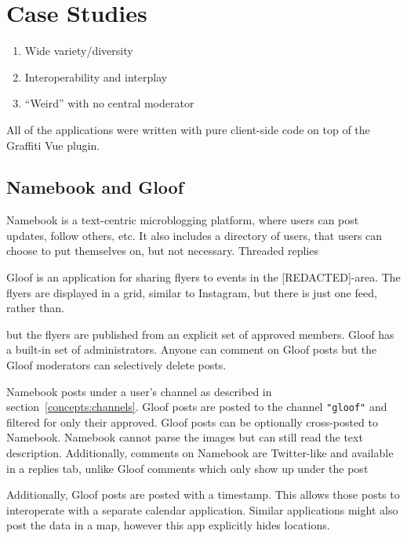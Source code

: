 \section{Case Studies}


\begin{enumerate}
\item
Wide variety/diversity
\item
Interoperability and interplay
\item
``Weird'' with no central moderator
\end{enumerate}
All of the applications were written with pure client-side code on
top of the Graffiti Vue plugin.

\subsection{Namebook and Gloof}

Namebook is a text-centric microblogging platform,
where users can post updates, follow others,
etc.
It also includes a directory of users, that users
can choose to put themselves on, but not necessary.
Threaded replies

Gloof is an application for sharing flyers to events in the [REDACTED]-area.
The flyers are displayed in a grid, similar to Instagram,
but there is just one feed, rather than.

but the flyers are published from an explicit set of approved members.
Gloof has a built-in set of administrators.
Anyone can comment on Gloof posts but the Gloof
moderators can selectively delete posts.

Namebook posts under a user's channel as described in section~\ref{concepts:channels}.
Gloof posts are posted to the channel \texttt{"gloof"} and filtered
for only their approved.
Gloof posts can be optionally cross-posted to Namebook.
Namebook cannot parse the images but can still read the
text description.
Additionally, comments on Namebook are Twitter-like
and available in a replies tab, unlike Gloof comments
which only show up under the post

Additionally, Gloof posts are posted with a timestamp.
This allows those posts to interoperate with a
separate calendar application.
Similar applications might also post the data in a map,
however this app explicitly hides locations.

